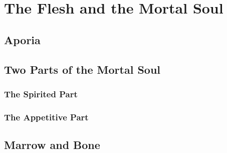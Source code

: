 
\chapter{The Flesh and the Mortal Soul} %
\label{cha:the_flesh_and_the_mortal_soul}

\section{Aporia} %
\label{sec:aporia}




\section{Two Parts of the Mortal Soul} %
\label{sec:two_parts_of_the_mortal_soul}



\subsection{The Spirited Part} %
\label{sub:the_spirited_part}




\subsection{The Appetitive Part} %
\label{sub:the_appetitive_part}





\section{Marrow and Bone} %
\label{sec:marrow_and_bone}




